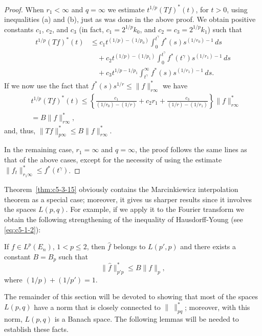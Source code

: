 \begin{proof}
When $r_{1} < \infty$ and $q = \infty$ we estimate $t^{1/p}(Tf)^{*}(t)$, for
$t > 0$, using inequalities (a) and (b), just as was done in the above proof.
We obtain positive constants $c_{1}$, $c_{2}$, and $c_{3}$ (in fact,
$c_{1} = 2^{1/p}k_{0}$, and $c_{2} = c_{3} = 2^{1/p}k_{1}$) such that
\begin{align*}
t^{1/p}(Tf)^{*}(t)&\leq c_{1}t^{(1/p)-(1/p_{0})}\int_{0}^{t^{\gamma}}f^{*}(s)s^{(1/r_{0})-1}\,ds\\
&\quad+c_{2}t^{(1/p)-(1/p_{1})}\int_{0}^{t^{\gamma}}f^{*}(t^{\gamma})s^{(1/r_{1})-1}\,ds\\
&\quad+c_{3}t^{1/p-1/p_{1}}\int_{t^{\gamma}}^{\infty}f^{*}(s)s^{(1/r_{1})-1}\,ds.
\end{align*}
If we now use the fact that $f^{*}(s)s^{1/r} \leq \|f\|_{r\infty}^{*}$ we have
\[
\begin{aligned}&t^{1/p}(Tf)^{*}(t)\leq\left\{\frac{c_{1}}{(1/r_{0})-(1/r)}+c_{2}r_{1}
+\frac{c_{3}}{(1/r)-(1/r_{1})}\right\}\|f\|_{r\infty}^{*}\\&=B\|f\|_{r\infty}^{*},\end{aligned}
\]
and, thus, $\|Tf\|_{p\infty}^{*} \leq B\|f\|_{r\infty}^{*}$.

In the remaining case, $r_{1} = \infty$ and $q = \infty$, the proof follows the
same lines as that of the above cases, except for the necessity of using the
estimate $\|f_{t}\|_{r_{1}\infty}^{*} \leq f^{*}(t^{\gamma})$.
\end{proof}

Theorem~\ref{thm:c5-3-15} obviously contains the Marcinkiewicz interpolation
theorem as a special case; moreover, it gives us sharper results since it
involves the spaces $L(p, q)$. For example, if we apply it to the Fourier
transform we obtain the following strengthening of the inequality of
Hausdorff-Young (see \eqref{eq:c5-1-2}):

\begin{corollary}\label{cor:c5-3-16}
If $f \in L^{p}(E_{n})$, $1 < p \leq 2$, then $\hat{f}$ belongs to
$L(p', p)$ and there exists a constant $B = B_{p}$ such that
\[
\|\hat{f}\|_{p'p}^{*}\leq B\|f\|_{p},
\]
where $(1/p) + (1/p') = 1$.
\end{corollary}

The remainder of this section will be devoted to showing that most of the
spaces $L(p, q)$ have a norm that is closely connected to $\|\ \|_{pq}^{*}$;
moreover, with this norm, $L(p, q)$ is a Banach space. The following lemmas
will be needed to establish these facts.

